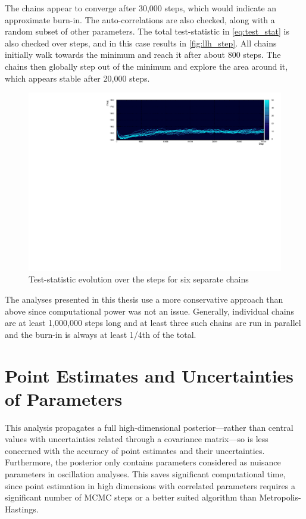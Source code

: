 The chains appear to converge after 30,000 steps, which would indicate an approximate burn-in. The auto-correlations are also checked, along with a random subset of other parameters. The total test-statistic in \autoref{eq:test_stat} is also checked over steps, and in this case results in \autoref{fig:llh_step}. All chains initially walk towards the minimum and reach it after about 800 steps. The chains then globally step out of the minimum and explore the area around it, which appears stable after 20,000 steps.
\begin{figure}[h]
	\includegraphics[width=\textwidth, trim={0mm 0mm 0mm 0mm}, clip,page=1]{figures/mcmc/logl_step0}
	\caption{Test-statistic evolution over the steps for six separate chains}
	\label{fig:llh_step}
\end{figure}

The analyses presented in this thesis use a more conservative approach than above since computational power was not an issue. Generally, individual chains are at least 1,000,000 steps long and at least three such chains are run in parallel and the burn-in is always at least 1/4th of the total.

\section{Point Estimates and Uncertainties of Parameters}
This analysis propagates a full high-dimensional posterior---rather than central values with uncertainties related through a covariance matrix---so is less concerned with the accuracy of point estimates and their uncertainties. Furthermore, the posterior only contains parameters considered as nuisance parameters in oscillation analyses. This saves significant computational time, since point estimation in high dimensions with correlated parameters requires a significant number of MCMC steps or a better suited algorithm than Metropolis-Hastings.

